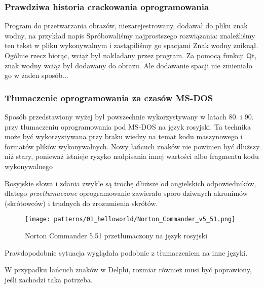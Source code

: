 \subsubsection{Prawdziwa historia crackowania oprogramowania}
\myindex{\SoftwareCracking}

Program do przetwarzania obrazów, niezarejestrowany, dodawał do pliku znak wodny,
na przykład napis 
Spróbowaliśmy najprostszego rozwiązania: znaleźliśmy ten tekst w pliku wykonywalnym i zastąpiliśmy go spacjami
Znak wodny zniknął.
Ogólnie rzecz biorąc, wciąż był nakładany przez program.
Za pomocą funkcji Qt, znak wodny wciąż był dodawany do obrazu.
Ale dodawanie spacji nie zmieniało go w żaden sposób...

\subsubsection{Tłumaczenie oprogramowania za czasów MS-DOS}

Sposób przedstawiony wyżej był powszechnie wykorzystywany w latach 80. i 90. przy tłumaczeniu oprogramowania pod MS-DOS na język rosyjski.
Ta technika może być wykorzystywana przy braku wiedzy na temat kodu maszynowego i formatów plików wykonywalnych.
Nowy łańcuch znaków nie powinien być dłuższy niż stary, ponieważ istnieje ryzyko nadpisania innej wartości albo fragmentu kodu wykonywalnego

Rosyjskie słowa i zdania zwykle są trochę dłuższe od angielskich odpowiedników, dlatego \emph{przetłumaczone} oprogramowanie zawierało
sporo dziwnych akronimów (skrótowców) i trudnych do zrozumienia skrótów.

\begin{figure}[H]
\centering
\texttt{[image: patterns/01\_helloworld/Norton\_Commander\_v5\_51.png]}
\caption{Norton Commander 5.51 przetłumaczony na język rosyjski}
\end{figure}

Prawdopodobnie sytuacja wyglądała podobnie z tłumaczeniem na inne języki.

W przypadku łańcuch znaków w Delphi, rozmiar również musi być poprawiony, jeśli zachodzi taka potrzeba.



